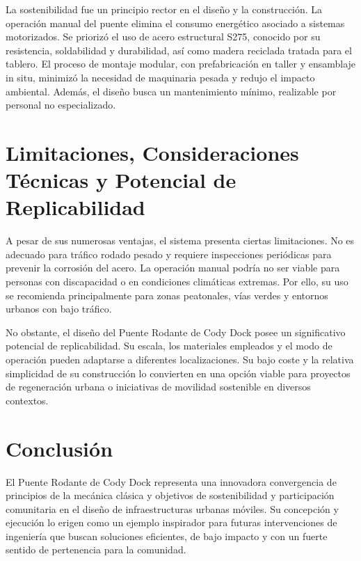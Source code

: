 \documentclass{IEEEtran}
\begin{document}
La sostenibilidad fue un principio rector en el diseño y la construcción. La operación manual del puente elimina el consumo energético asociado a sistemas motorizados. Se priorizó el uso de acero estructural S275, conocido por su resistencia, soldabilidad y durabilidad, así como madera reciclada tratada para el tablero. El proceso de montaje modular, con prefabricación en taller y ensamblaje in situ, minimizó la necesidad de maquinaria pesada y redujo el impacto ambiental. Además, el diseño busca un mantenimiento mínimo, realizable por personal no especializado.

\section{Limitaciones, Consideraciones Técnicas y Potencial de Replicabilidad}

A pesar de sus numerosas ventajas, el sistema presenta ciertas limitaciones. No es adecuado para tráfico rodado pesado y requiere inspecciones periódicas para prevenir la corrosión del acero. La operación manual podría no ser viable para personas con discapacidad o en condiciones climáticas extremas. Por ello, su uso se recomienda principalmente para zonas peatonales, vías verdes y entornos urbanos con bajo tráfico.

No obstante, el diseño del Puente Rodante de Cody Dock posee un significativo potencial de replicabilidad. Su escala, los materiales empleados y el modo de operación pueden adaptarse a diferentes localizaciones. Su bajo coste y la relativa simplicidad de su construcción lo convierten en una opción viable para proyectos de regeneración urbana o iniciativas de movilidad sostenible en diversos contextos.

\section{Conclusión}

El Puente Rodante de Cody Dock representa una innovadora convergencia de principios de la mecánica clásica y objetivos de sostenibilidad y participación comunitaria en el diseño de infraestructuras urbanas móviles. Su concepción y ejecución lo erigen como un ejemplo inspirador para futuras intervenciones de ingeniería que buscan soluciones eficientes, de bajo impacto y con un fuerte sentido de pertenencia para la comunidad.

\nocite{*}
\printbibliography
\end{document}
